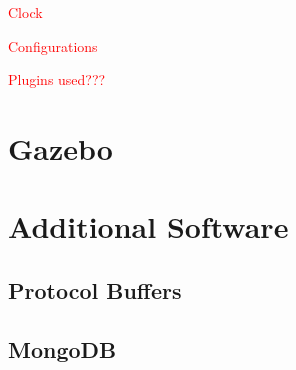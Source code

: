 \textcolor{red}{Clock}

\textcolor{red}{Configurations}

\textcolor{red}{Plugins used???}

\section{Gazebo}
\section{Additional Software}
\subsection{Protocol Buffers}
\subsection{MongoDB}
